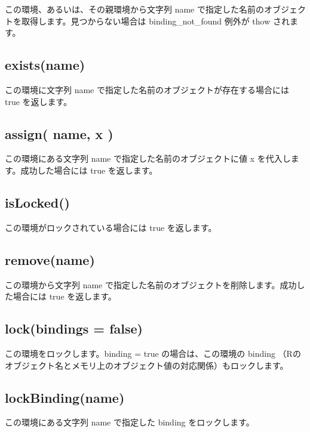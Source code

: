 \documentclass[]{book}
\begin{document}
この環境、あるいは、その親環境から文字列 name で指定した名前のオブジェクトを取得します。見つからない場合は binding\_not\_found 例外が thow されます。

\hypertarget{existsname}{%
\subsection{exists(name)}\label{existsname}}

この環境に文字列 name で指定した名前のオブジェクトが存在する場合には true を返します。

\hypertarget{assign-name-x}{%
\subsection{assign( name, x )}\label{assign-name-x}}

この環境にある文字列 name で指定した名前のオブジェクトに値 x を代入します。成功した場合には true を返します。

\hypertarget{islocked}{%
\subsection{isLocked()}\label{islocked}}

この環境がロックされている場合には true を返します。

\hypertarget{removename}{%
\subsection{remove(name)}\label{removename}}

この環境から文字列 name で指定した名前のオブジェクトを削除します。成功した場合には true を返します。

\hypertarget{lockbindings-false}{%
\subsection{lock(bindings = false)}\label{lockbindings-false}}

この環境をロックします。binding = true の場合は、この環境の binding （Rのオブジェクト名とメモリ上のオブジェクト値の対応関係）もロックします。

\hypertarget{lockbindingname}{%
\subsection{lockBinding(name)}\label{lockbindingname}}

この環境にある文字列 name で指定した binding をロックします。
\end{document}
